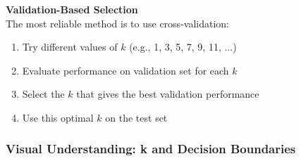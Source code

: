 \documentclass[11pt,a4paper]{article}
\theoremstyle{definition}
\theoremstyle{plain}
\theoremstyle{remark}
\begin{document}
\begin{center}
\colorbox{yellow!20}{\parbox{0.9\textwidth}{
\textbf{Validation-Based Selection}\\[0.2cm]
The most reliable method is to use cross-validation:
\begin{enumerate}
    \item Try different values of $k$ (e.g., 1, 3, 5, 7, 9, 11, ...)
    \item Evaluate performance on validation set for each $k$
    \item Select the $k$ that gives the best validation performance
    \item Use this optimal $k$ on the test set
\end{enumerate}
}}
\end{center}

\subsubsection{Visual Understanding: k and Decision Boundaries}
\end{document}
